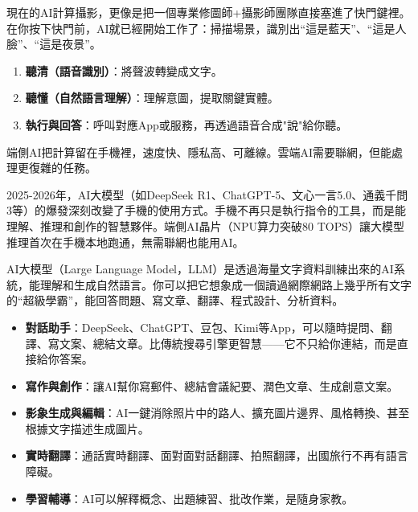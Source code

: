 


現在的AI計算攝影，更像是把一個專業修圖師+攝影師團隊直接塞進了快門鍵裡。在你按下快門前，AI就已經開始工作了：掃描場景，識別出“這是藍天”、“這是人臉”、“這是夜景”。


\begin{enumerate}
  \item \textbf{聽清（語音識別）}：將聲波轉變成文字。
  \item \textbf{聽懂（自然語言理解）}：理解意圖，提取關鍵實體。
  \item \textbf{執行與回答}：呼叫對應App或服務，再透過語音合成"說"給你聽。
\end{enumerate}


端側AI把計算留在手機裡，速度快、隱私高、可離線。雲端AI需要聯網，但能處理更復雜的任務。


2025-2026年，AI大模型（如DeepSeek R1、ChatGPT-5、文心一言5.0、通義千問3等）的爆發深刻改變了手機的使用方式。手機不再只是執行指令的工具，而是能理解、推理和創作的智慧夥伴。端側AI晶片（NPU算力突破80 TOPS）讓大模型推理首次在手機本地跑通，無需聯網也能用AI。


AI大模型（Large Language Model，LLM）是透過海量文字資料訓練出來的AI系統，能理解和生成自然語言。你可以把它想象成一個讀過網際網路上幾乎所有文字的“超級學霸”，能回答問題、寫文章、翻譯、程式設計、分析資料。


\begin{itemize}
  \item \textbf{對話助手}：DeepSeek、ChatGPT、豆包、Kimi等App，可以隨時提問、翻譯、寫文案、總結文章。比傳統搜尋引擎更智慧——它不只給你連結，而是直接給你答案。
  \item \textbf{寫作與創作}：讓AI幫你寫郵件、總結會議紀要、潤色文章、生成創意文案。
  \item \textbf{影象生成與編輯}：AI一鍵消除照片中的路人、擴充圖片邊界、風格轉換、甚至根據文字描述生成圖片。
  \item \textbf{實時翻譯}：通話實時翻譯、面對面對話翻譯、拍照翻譯，出國旅行不再有語言障礙。
  \item \textbf{學習輔導}：AI可以解釋概念、出題練習、批改作業，是隨身家教。
\end{itemize}

